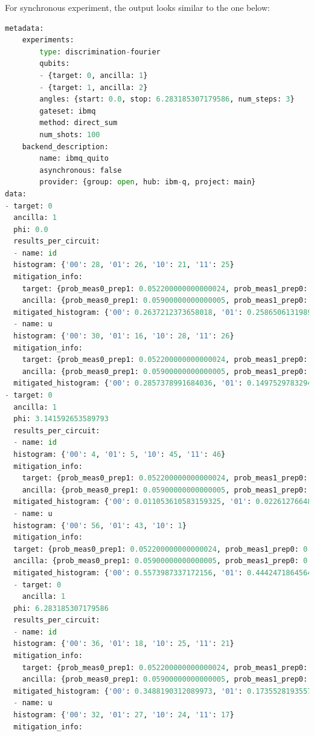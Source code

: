 \documentclass[preprint,12pt, a4paper, dvipsnames]{elsarticle}
\newcommand{\1}{{\rm 1\hspace{-0.9mm}l}}
\begin{document}
For synchronous experiment, the output looks similar to the one below: 
\begin{lstlisting}[language=Python]
metadata:
	experiments:
		type: discrimination-fourier
		qubits:
		- {target: 0, ancilla: 1}
		- {target: 1, ancilla: 2}
		angles: {start: 0.0, stop: 6.283185307179586, num_steps: 3}
		gateset: ibmq
		method: direct_sum
		num_shots: 100
	backend_description:
		name: ibmq_quito
		asynchronous: false
		provider: {group: open, hub: ibm-q, project: main}
data:
- target: 0
  ancilla: 1
  phi: 0.0
  results_per_circuit:
  - name: id
  histogram: {'00': 28, '01': 26, '10': 21, '11': 25}
  mitigation_info:
	target: {prob_meas0_prep1: 0.052200000000000024, prob_meas1_prep0: 0.0172}
	ancilla: {prob_meas0_prep1: 0.05900000000000005, prob_meas1_prep0: 0.0202}
  mitigated_histogram: {'00': 0.2637212373658018, '01': 0.25865061319892463, '10': 0.2067279352110304, '11': 0.2709002142242433}
  - name: u
  histogram: {'00': 30, '01': 16, '10': 28, '11': 26}
  mitigation_info:
	target: {prob_meas0_prep1: 0.052200000000000024, prob_meas1_prep0: 0.0172}
	ancilla: {prob_meas0_prep1: 0.05900000000000005, prob_meas1_prep0: 0.0202}
  mitigated_histogram: {'00': 0.2857378991684036, '01': 0.14975297832942433, '10': 0.28142307224788693, '11': 0.2830860502542851}
- target: 0
  ancilla: 1
  phi: 3.141592653589793
  results_per_circuit:
  - name: id
  histogram: {'00': 4, '01': 5, '10': 45, '11': 46}
  mitigation_info:
	target: {prob_meas0_prep1: 0.052200000000000024, prob_meas1_prep0: 0.0172}
	ancilla: {prob_meas0_prep1: 0.05900000000000005, prob_meas1_prep0: 0.0202}
  mitigated_histogram: {'00': 0.011053610583159325, '01': 0.02261276648026373, '10': 0.4593955619936729, '11': 0.5069380609429042}
  - name: u
  histogram: {'00': 56, '01': 43, '10': 1}
  mitigation_info:
  target: {prob_meas0_prep1: 0.052200000000000024, prob_meas1_prep0: 0.0172}
  ancilla: {prob_meas0_prep1: 0.05900000000000005, prob_meas1_prep0: 0.0202}
  mitigated_histogram: {'00': 0.5573987337172156, '01': 0.44424718645642625, '10': -0.0016459201736417181}
  - target: 0
    ancilla: 1
  phi: 6.283185307179586
  results_per_circuit:
  - name: id
  histogram: {'00': 36, '01': 18, '10': 25, '11': 21}
  mitigation_info:
	target: {prob_meas0_prep1: 0.052200000000000024, prob_meas1_prep0: 0.0172}
	ancilla: {prob_meas0_prep1: 0.05900000000000005, prob_meas1_prep0: 0.0202}
  mitigated_histogram: {'00': 0.3488190312089973, '01': 0.17355281935572894, '10': 0.2505792064871127, '11': 0.22704894294816103}
  - name: u
  histogram: {'00': 32, '01': 27, '10': 24, '11': 17}
  mitigation_info:

\end{lstlisting}
\end{document}
